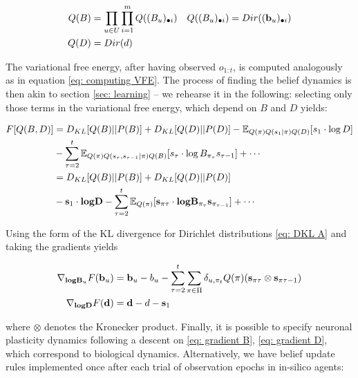 \documentclass[review,12pt,authoryear]{elsarticle}
\newcommand{\E}{\mathbb E}
\begin{document}
\begin{equation}
    \begin{split}
        Q(B)&= \prod_{u\in U}\prod_{i=1}^m Q((B_u)_{\bullet i})\quad Q((B_u)_{\bullet i})=Dir((\bold b_u)_{\bullet i}) \\
        Q(D)&= Dir(d)
    \end{split}
\end{equation}
 
The variational free energy, after having observed $o_{1:t}$, is computed analogously as in equation \eqref{eq: computing VFE}. The process of finding the belief dynamics is then akin to section \ref{sec: learning} -- we rehearse it in the following: selecting only those terms in the variational free energy, which depend on $B$ and $D$ yields:

\begin{equation}
    \begin{split}
        F[Q(B,D)] &= D_{KL}[Q(B)||P(B)] + D_{KL}[Q(D)||P(D)] 
         - \E_{Q(\pi)Q(s_1|\pi)Q(D)}[s_1\cdot \log D] \\ &- \sum_{\tau=2}^t \E_{Q(\pi)Q(s_\tau,s_{\tau-1} |\pi) Q(B)} [s_\tau \cdot \log B_{\pi_\tau}s_{\tau-1}] +\cdots\\
        &= D_{KL}[Q(B)||P(B)] + D_{KL}[Q(D)||P(D)] \\
        &- \bold s_1 \cdot \textbf{log} \bold D-\sum_{\tau=2}^t \E_{Q(\pi)}[\bold s_{\pi\tau} \cdot \textbf{log} \bold B_{\pi_\tau} \bold s_{\pi_{\tau-1}} ]+ \cdots
    \end{split}
\end{equation}
 
Using the form of the KL divergence for Dirichlet distributions \eqref{eq: DKL A} and taking the gradients yields

\begin{align}
       \label{eq: gradient B} \nabla_{\textbf{log} \bold B_u} F(\bold b_u) &=  \bold b_u -b_u -\sum_{\tau =2}^t \sum_{\pi \in \Pi} \delta_{u, \pi_t}  Q(\pi)(\bold s_{\pi\tau} \otimes \bold s_{\pi\tau-1})\\
       \label{eq: gradient D} \nabla_{\textbf{log} \bold D} F(\bold d) &=\bold d -d- \bold s_1
\end{align}

 
where $\otimes$ denotes the Kronecker product. Finally, it is possible to specify neuronal plasticity dynamics following a descent on \eqref{eq: gradient B}, \eqref{eq: gradient D}, which correspond to biological dynamics. Alternatively, we have belief update rules implemented once after each trial of observation epochs in in-silico agents:
\end{document}
